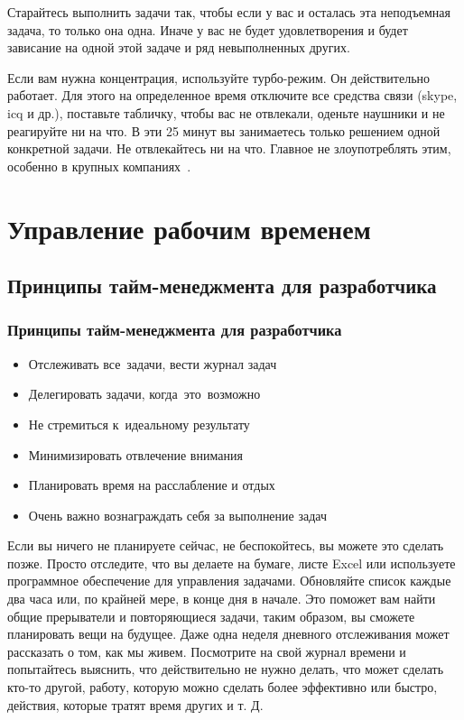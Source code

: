 \documentclass{../industrial-development}
\begin{document}
Старайтесь выполнить задачи так, чтобы если у вас и осталась эта неподъемная задача, то только она одна. Иначе у вас не будет удовлетворения и будет зависание на одной этой задаче и ряд невыполненных других.

Если вам нужна концентрация, используйте турбо-режим. Он действительно работает. Для этого на определенное время отключите все средства связи (skype, icq и др.), поставьте табличку, чтобы вас не отвлекали, оденьте наушники и не реагируйте ни на что. В эти 25 минут вы занимаетесь только решением одной конкретной задачи. Не отвлекайтесь ни на что. Главное не злоупотреблять этим, особенно в крупных компаниях~\cite{TMHabr}.

\section{Управление рабочим временем}

\subsection{Принципы тайм-менеджмента для разработчика}

\begin{frame} \frametitle{Принципы тайм-менеджмента для разработчика}
  \begin{itemize}
  \item Отслеживать все~задачи, вести журнал задач
  \item Делегировать задачи, когда~это~возможно
  \item Не стремиться к~идеальному результату
  \item Минимизировать отвлечение внимания
  \item Планировать время на расслабление и отдых
  \item Очень важно вознаграждать себя за выполнение задач
  \end{itemize}
\end{frame}

\lecturenotes

Если вы ничего не планируете сейчас, не беспокойтесь, вы можете это сделать позже. Просто отследите, что вы делаете на бумаге, листе Excel или используете программное обеспечение для управления задачами. Обновляйте список каждые два часа или, по крайней мере, в конце дня в начале. Это поможет вам найти общие прерыватели и повторяющиеся задачи, таким образом, вы сможете планировать вещи на будущее. Даже одна неделя дневного отслеживания может рассказать о том, как мы живем.
Посмотрите на свой журнал времени и попытайтесь выяснить, что действительно не нужно делать, что может сделать кто-то другой, работу, которую можно сделать более эффективно или быстро, действия, которые тратят время других и т. Д.
\end{document}
